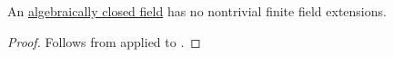 \begin{proposition}\label{thm:no_finite_extensions_of_closed_fields}
  An \hyperref[def:algebraically_closed_field]{algebraically closed field} has no nontrivial finite field extensions.
\end{proposition}
\begin{proof}
  Follows from  applied to .
\end{proof}
